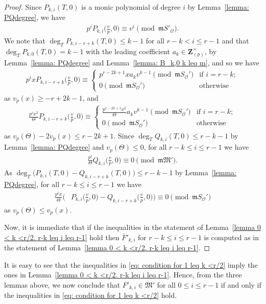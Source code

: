 \documentclass[11pt]{amsart}
\theoremstyle{definition}
\numberwithin{equation}{subsection}
\theoremstyle{plain}
\theoremstyle{plain}
\theoremstyle{plain}
\theoremstyle{plain}
\theoremstyle{plain}
\theoremstyle{plain}
\theoremstyle{plain}
\theoremstyle{plain}
\theoremstyle{plain}
\theoremstyle{plain}
\theoremstyle{plain}
\theoremstyle{plain}
\theoremstyle{definition}
\theoremstyle{definition}
\theoremstyle{definition}
\theoremstyle{remark}
\renewcommand{\(}{\textup{(}}
\renewcommand{\)}{\textup{)}}
\newcommand{\Z}{\mathbf{Z}}
\newcommand{\fM}{\mathfrak{M}}
\newcommand{\fm}{\mathfrak{m}}
\newcommand{\cO}{\mathcal{O}}
\newcommand{\barF}{\overline{F}}
\begin{document}
\begin{proof}
Since $P_{k,i}(T,0)$ is a monic polynomial of degree $i$ by Lemma~\ref{lemma: PQdegree}, we have
\begin{align*}
    p^iP_{k,i}\Big(\frac{v}{p},0\Big)\equiv v^i \pmod{\fm S'_\cO}.
\end{align*}
We note that $\deg_T P_{k,i-r+k}(T,0)\leq k-1$ for all $r-k<i\leq r-1$ and that $\deg_TP_{k,0}(T,0)=k-1$ with the leading coefficient $a_k\in\Z_{(p)}^{\times}$, by Lemma~\ref{lemma: PQdegree} and Lemma~\ref{lemma: B_k,0 k leq m}, and so we have
\begin{align*}
    p^ix P_{k,i-r+k}\Big(\frac{v}{p},0\Big)\equiv
    \begin{cases}
        p^{r-2k+1}xa_kv^{k-1}\pmod{\fm S_\cO'} & \mbox{if } i=r-k; \\
        0 \pmod{\fm S_\cO'}& \mbox{otherwise}
    \end{cases}
\end{align*}
as $v_p(x)\geq -r+2k-1$, and
\begin{align*}
    \frac{p^ix^2}{\Theta}P_{k,i-r+k}\Big(\frac{v}{p},0\Big)\equiv
    \begin{cases}
        \frac{p^{r-2k+1}x^2}{\Theta}a_kv^{k-1}\pmod{\fm S_\cO'} & \mbox{if } i=r-k; \\
        0 \pmod{\fm S_\cO'}& \mbox{otherwise}
    \end{cases}
\end{align*}
as $v_p(\Theta)-2v_p(x)\leq r-2k+1$. Since $\deg_T Q_{k,i}(T,0)\leq r-k-1$ by Lemma~\ref{lemma: PQdegree} and $v_p(\Theta)\leq 0$, for all $r-k\leq i\leq r-1$ we have
\begin{align*}
    \frac{p^i}{\Theta}Q_{k,i}\Big(\frac{v}{p},0\Big) \equiv 0 \pmod{\fm\fM'}.
\end{align*}
As $\deg_T \big(P_{k,i}(T,0)-Q_{k,i-r+k}(T,0)\big)\leq r-k-1$ by Lemma~\ref{lemma: PQdegree}, for all $r-k\leq i\leq r-1$
we have
\begin{align*}
    \frac{p^ix}{\Theta}\Big(&
    P_{k,i}\Big(\frac{v}{p},0\Big)-Q_{k,i-r+k}\Big(\frac{v}{p},0\Big)
    \Big)
    \equiv
    0 \pmod{\fm S_\cO'}
\end{align*}
as $v_p(\Theta)\leq v_p(x)$.

Now, it is immediate that if the inequalities in the statement of Lemma~\ref{lemma 0 < k <r/2. r-k leq i leq r-1} hold then $\barF'_{k,i}$ for $r-k\leq i\leq r-1$ is computed as in the statement of Lemma~\ref{lemma 0 < k <r/2. r-k leq i leq r-1}.
\end{proof}

It is easy to see that the inequalities in \eqref{eq: condition for 1 leq k <r/2} imply the ones in Lemma~\ref{lemma 0 < k <r/2. r-k leq i leq r-1}. Hence, from the three lemmas above, we now conclude that $F'_{k,i}\in\fM'$ for all $0\leq i\leq r-1$ if and only if the inequalities in \eqref{eq: condition for 1 leq k <r/2} hold.
\end{document}
